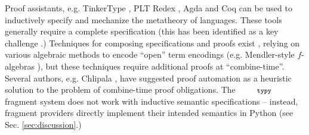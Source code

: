 \documentclass[10pt]{sigplanconf}
\newcommand{\typy}{\texttt{\footnotesize typy}}
\begin{document}


Proof assistants, e.g. TinkerType \cite{LevinPierce99}, PLT Redex \cite{Felleisen-Findler-Flatt09}, Agda \cite{norell2007towards} and Coq \cite{Coq:manual} can be used to inductively specify and mechanize the metatheory of languages. These tools generally require a complete specification (this  has been identified as a key challenge \cite{aydemir05tphols}.) Techniques for composing specifications and proofs exist \cite{conf/popl/DelawareOS13,Delaware11,conf/plpv/SchwaabS13}, relying on various algebraic methods to encode ``open'' term encodings (e.g. Mendler-style $f$-algebras \cite{conf/popl/DelawareOS13}), but these techniques  require additional proofs at ``combine-time''. %
Several authors, e.g. Chlipala  \cite{Chlipala10}, have suggested  proof automation as a heuristic solution to the problem of combine-time proof obligations. 
The $\typy$ fragment system does not work with inductive semantic specifications -- instead, fragment providers directly implement their intended semantics in Python (see Sec. \ref{sec:discussion}.) 
\end{document}
